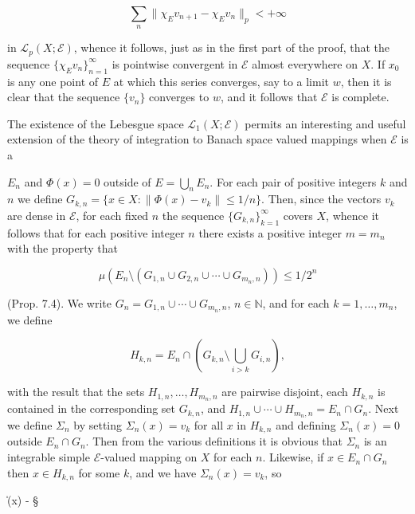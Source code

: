 $$\sum_n \|\chi_E v_{n+1} - \chi_E v_n\|_p < +\infty$$

in $\mathcal{L}_p(X; \mathcal{E})$, whence it follows, just as in the first part of the proof, that the sequence $\{\chi_E v_n\}_{n=1}^{\infty}$ is pointwise convergent in $\mathcal{E}$ almost everywhere on $X$. If $x_0$ is any one point of $E$ at which this series converges, say to a limit $w$, then it is clear that the sequence $\{v_n\}$ converges to $w$, and it follows that $\mathcal{E}$ is complete.

The existence of the Lebesgue space $\mathcal{L}_1(X; \mathcal{E})$ permits an interesting and useful extension of the theory of integration to Banach space valued mappings when $\mathcal{E}$ is a

$E_n$ and $\Phi(x) = 0$ outside of $E = \bigcup_n E_n$. For each pair of positive integers $k$ and $n$ we define $G_{k,n} = \{x \in X : \|\Phi(x) - v_k\| \leq 1/n\}$. Then, since the vectors $v_k$ are dense in $\mathcal{E}$, for each fixed $n$ the sequence $\{G_{k,n}\}_{k=1}^{\infty}$ covers $X$, whence it follows that for each positive integer $n$ there exists a positive integer $m = m_n$ with the property that

$$\mu(E_n \setminus (G_{1,n} \cup G_{2,n} \cup \cdots \cup G_{m_n,n})) \leq 1/2^n$$

(Prop. 7.4). We write $G_n = G_{1,n} \cup \cdots \cup G_{m_n,n}$, $n \in \mathbb{N}$, and for each $k = 1, \ldots, m_n$, we define

$$H_{k,n} = E_n \cap \left(G_{k,n} \setminus \bigcup_{i>k} G_{i,n}\right),$$

with the result that the sets $H_{1,n}, \ldots, H_{m_n,n}$ are pairwise disjoint, each $H_{k,n}$ is contained in the corresponding set $G_{k,n}$, and $H_{1,n} \cup \cdots \cup H_{m_n,n} = E_n \cap G_n$. Next we define $\Sigma_n$ by setting $\Sigma_n(x) = v_k$ for all $x$ in $H_{k,n}$ and defining $\Sigma_n(x) = 0$ outside $E_n \cap G_n$. Then from the various definitions it is obvious that $\Sigma_n$ is an integrable simple $\mathcal{E}$-valued mapping on $X$ for each $n$. Likewise, if $x \in E_n \cap G_n$ then $x \in H_{k,n}$ for some $k$, and we have $\Sigma_n(x) = v_k$, so

$$\|\Phi(x) - \S
